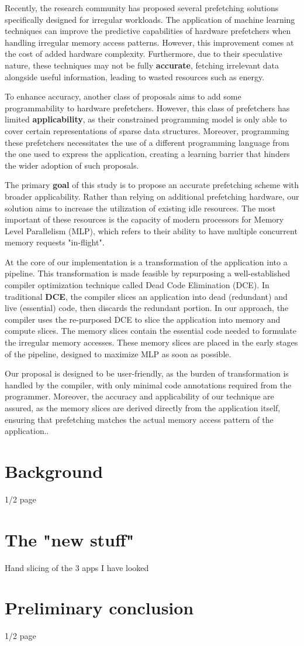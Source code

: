 \documentclass{acaces}
\begin{document}
Recently, the research community has proposed several prefetching solutions specifically designed for irregular workloads.
The application of machine learning techniques can improve the predictive capabilities of hardware prefetchers when handling irregular memory access patterns.
However, this improvement comes at the cost of added hardware complexity.
Furthermore, due to their speculative nature, these techniques may not be fully \textbf{accurate}, fetching irrelevant data alongside useful information,
leading to wasted resources such as energy.

To enhance accuracy, another class of proposals aims to add some programmability to hardware prefetchers.
However, this class of prefetchers has limited \textbf{applicability},
as their constrained programming model is only able to cover certain representations of sparse data structures.
Moreover, programming these prefetchers necessitates the use of a different programming language from the one used to express the application,
creating a learning barrier that hinders the wider adoption of such proposals.

The primary \textbf{goal} of this study is to propose an accurate prefetching scheme with broader applicability.
Rather than relying on additional prefetching hardware, our solution aims to increase the utilization of existing idle resources.
The most important of these resources is the capacity of modern processors for Memory Level Parallelism (MLP),
which refers to their ability to have multiple concurrent memory requests "in-flight".

At the core of our implementation is a transformation of the application into a pipeline.
This transformation is made feasible by repurposing a well-established compiler optimization technique called Dead Code Elimination (DCE).
In traditional \textbf{DCE}, the compiler slices an application into dead (redundant) and live (essential) code, then discards the redundant portion.
In our approach, the compiler uses the re-purposed DCE to slice the application into memory and compute slices.
The memory slices contain the essential code needed to formulate the irregular memory accesses.
These memory slices are placed in the early stages of the pipeline, designed to maximize MLP as soon as possible.

Our proposal is designed to be user-friendly, as the burden of transformation is handled by the compiler, with only minimal code annotations required from the programmer.
Moreover, the accuracy and applicability of our technique are assured, as the memory slices are derived directly from the application itself,
ensuring that prefetching matches the actual memory access pattern of the application..

\section{Background}

1/2 page

\section{The "new stuff"} 

Hand slicing of the 3 apps I have looked

\section{Preliminary conclusion}

1/2 page


\end{document}

